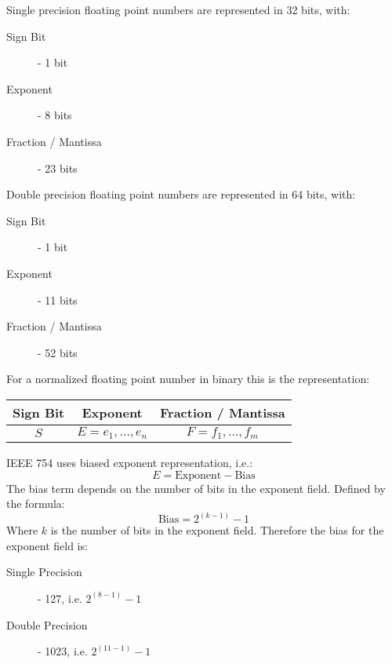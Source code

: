 \documentclass[12pt letter]{report}
\begin{document}
Single precision floating point numbers are represented in 32 bits, with:
\begin{description}
  \item[Sign Bit]  - 1 bit
  \item[Exponent] - 8 bits
  \item[Fraction / Mantissa] - 23 bits
\end{description}

Double precision floating point numbers are represented in 64 bits, with:
\begin{description}
  \item[Sign Bit]  - 1 bit
  \item[Exponent] - 11 bits
  \item[Fraction / Mantissa] - 52 bits
\end{description}

For a normalized floating point number in binary this is the representation:
\begin{table}[h!]
  \begin{center}
    \begin{tabular}{|c|c|c|}
      \hline
      \textbf{Sign Bit} & \textbf{Exponent}      & \textbf{Fraction / Mantissa} \\
      \hline
      $S$               & $E = e_1, \ldots, e_n$ & $F = f_1, \ldots, f_m$       \\
      \hline
    \end{tabular}
  \end{center}
\end{table}

IEEE 754 uses biased exponent representation, i.e.:
\[
  E = \text{Exponent} - \text{Bias}
\]
The bias term depends on the number of bits in the exponent field. Defined by the formula:
\[
  \text{Bias} = 2^{(k-1)} - 1
\]
Where $k$ is the number of bits in the exponent field. Therefore the bias for the exponent field is:
\begin{description}
  \item[Single Precision] - 127, i.e. $2^{(8-1)} - 1$
  \item [Double Precision] - 1023, i.e. $2^{(11-1)} - 1$
\end{description}
\end{document}

